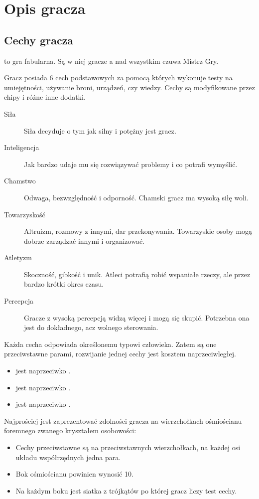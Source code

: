 \chapter{Opis gracza}
\section{Cechy gracza}
\kosmoramus{} to gra fabularna. Są w niej gracze a nad wszystkim czuwa Mistrz Gry.

Gracz posiada 6 cech podstawowych za pomocą których wykonuje testy na umiejętności, używanie broni, urządzeń, czy wiedzy.
Cechy są modyfikowane przez chipy i różne inne dodatki.
\begin{description}
 \item[Siła \abs{}] Siła decyduje o tym jak silny i potężny jest gracz.
 \item[Inteligencja \abi{}] Jak bardzo udaje mu się rozwiązywać problemy i co potrafi wymyślić.
 \item[Chamstwo \abh{}] Odwaga, bezwzględność i odporność. Chamski gracz ma wysoką siłę woli.
 \item[Towarzyskość \abt{}] Altruizm, rozmowy z innymi, dar przekonywania. Towarzyskie osoby mogą dobrze zarządzać innymi i organizować.
 \item[Atletyzm \aba{}] Skoczność, gibkość i unik. Atleci potrafią robić wspaniałe rzeczy, ale przez bardzo krótki okres czasu.
 \item[Percepcja \abp{}] Gracze z wysoką percepcją widzą więcej i mogą się skupić. Potrzebna ona jest do dokładnego, acz wolnego sterowania.
\end{description}

Każda cecha odpowiada określonemu typowi człowieka.
Zatem są one przeciwstawne parami, rozwijanie jednej cechy jest kosztem naprzeciwległej.
\begin{itemize}
 \item \abs{} jest naprzeciwko \abi{}.
 \item \abh{} jest naprzeciwko \abt{}.
 \item \aba{} jest naprzeciwko \abp{}.
\end{itemize}

Najprościej jest zaprezentować zdolności gracza na wierzchołkach ośmiościanu foremnego zwanego kryształem osobowości:
\begin{itemize}
 \item Cechy przeciwstawne są na przeciwstawnych wierzchołkach, na każdej osi układu współrzędnych jedna para.
 \item Bok ośmiościanu powinien wynosić 10.
 \item Na każdym boku jest siatka z trójkątów po której gracz liczy test cechy.
\end{itemize}

